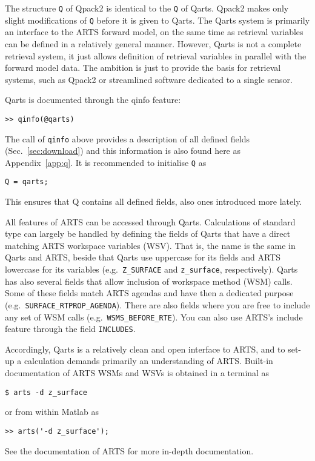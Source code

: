 \documentclass[a4paper,11pt]{article}
\begin{document}
The structure \verb|Q| of Qpack2 is identical to the \verb|Q| of Qarts. Qpack2
makes only slight modifications of \verb|Q| before it is given to Qarts. The
Qarts system is primarily an interface to the ARTS forward model, on the same
time as retrieval variables can be defined in a relatively general manner.
However, Qarts is not a complete retrieval system, it just allows definition of
retrieval variables in parallel with the forward model data. The ambition is
just to provide the basis for retrieval systems, such as Qpack2 or streamlined
software dedicated to a single sensor.

Qarts is documented through the qinfo feature:
\begin{verbatim}
>> qinfo(@qarts)
\end{verbatim}
The call of \verb|qinfo| above provides a description of all defined fields
(Sec.\ \ref{sec:download}) and this information is also found here as
Appendix~\ref{app:q}. It is recommended to initialise \verb|Q| as
\begin{verbatim}
Q = qarts;
\end{verbatim}
This ensures that Q contains all defined fields, also ones introduced more
lately. 

All features of ARTS can be accessed through Qarts. Calculations of standard
type can largely be handled by defining the fields of Qarts that have a direct
matching ARTS workspace variables (WSV). That is, the name is the same in Qarts
and ARTS, beside that Qarts use uppercase for its fields and ARTS lowercase for
its variables (e.g.\ \verb|Z_SURFACE| and \verb|z_surface|, respectively).
Qarts has also several fields that allow inclusion of workspace method (WSM)
calls. Some of these fields match ARTS agendas and have then a dedicated
purpose (e.g.\ \verb|SURFACE_RTPROP_AGENDA|). There are also fields where you are
free to include any set of WSM calls (e.g.\ \verb|WSMS_BEFORE_RTE|). You can
also use ARTS's include feature through the field \verb|INCLUDES|.

Accordingly, Qarts is a relatively clean and open interface to ARTS, and to
set-up a calculation demands primarily an understanding of ARTS. Built-in
documentation of ARTS WSMs and WSVs is obtained in a terminal as
\begin{verbatim}
$ arts -d z_surface
\end{verbatim}
or from within Matlab as
\begin{verbatim}
>> arts('-d z_surface');
\end{verbatim}
See the documentation of ARTS for more in-depth documentation. 
\end{document}
